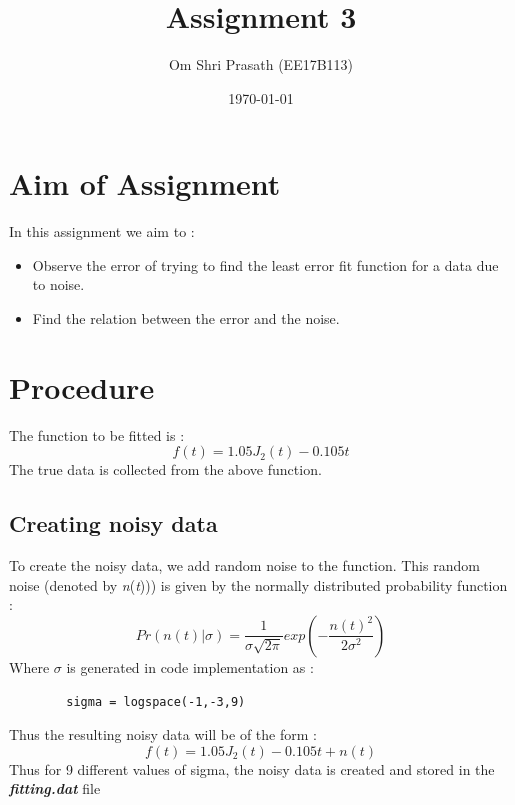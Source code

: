 \documentclass[11pt, a4paper]{article}
\title{Assignment 3} %
\author{Om Shri Prasath (EE17B113)} %
\date{\today} %
\begin{document}
		
		
\maketitle %
\section{Aim of Assignment}

 In this assignment we aim to :
 \begin{itemize}
     \item Observe the error of trying to find the least error fit function for a data due to noise.
     \item Find the relation between the error and the noise.
 \end{itemize}

\section{Procedure}
The function to be fitted is :
\begin{equation*}
    f(t) = 1.05J_2(t)-0.105t
\end{equation*}
The true data is collected from the above function.
\subsection{Creating noisy data}
    To create the noisy data, we add random noise to the function. This random noise (denoted by \textit{n}(\textit{t})))
    is given by the normally distributed probability function :
    \begin{equation*}
        Pr(n(t)|\sigma)=\frac{1}{\sigma\sqrt{2\pi}}exp\left(-\frac{n(t)^2}{2\sigma^2}\right)
    \end{equation*}
    Where $\sigma$ is generated in code implementation as :
    \begin{lstlisting}
        sigma = logspace(-1,-3,9)
    \end{lstlisting}
Thus the resulting noisy data will be of the form :
\begin{equation*}
    f(t) = 1.05J_2(t)-0.105t+n(t)
\end{equation*}
Thus for 9 different values of sigma, the noisy data is created and stored in the \textit{\textbf{fitting.dat}} file
\end{document}
